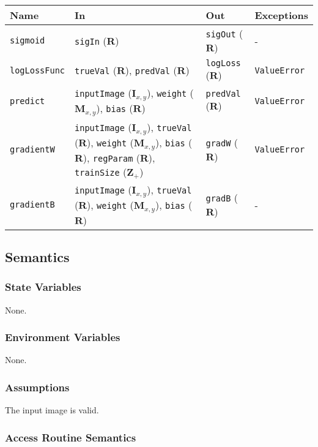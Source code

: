 \documentclass[12pt, titlepage]{article}
\def\code#1{\texttt{#1}}
\begin{document}
\begin{center}
\begin{tabular}{p{3cm} p{5cm} p{3cm} p{1cm}}
\hline
\textbf{Name} & \textbf{In} & \textbf{Out} & \textbf{Exceptions} \\
\hline
\code{sigmoid} & \code{sigIn} ($\mathbf{R}$) & \code{sigOut} ($\mathbf{R}$) & - \\
\code{logLossFunc} & \code{trueVal} ($\mathbf{R}$), \code{predVal} ($\mathbf{R}$) & \code{logLoss} ($\mathbf{R}$) & \code{ValueError} \\
\code{predict} & \code{inputImage} ($\mathbf{I}_{x,y}$), \code{weight} ($\mathbf{M}_{x,y}$), \code{bias} ($\mathbf{R}$) & \code{predVal} ($\mathbf{R}$) & \code{ValueError} \\
\code{gradientW} & \code{inputImage} ($\mathbf{I}_{x,y}$), \code{trueVal} ($\mathbf{R}$), \code{weight} ($\mathbf{M}_{x,y}$), \code{bias} ($\mathbf{R}$), \code{regParam} ($\mathbf{R}$), \code{trainSize} ($\mathbf{Z}_{+}$)& \code{gradW} ($\mathbf{R}$) & \code{ValueError} \\
\code{gradientB} & \code{inputImage} ($\mathbf{I}_{x,y}$), \code{trueVal} ($\mathbf{R}$), \code{weight} ($\mathbf{M}_{x,y}$), \code{bias} ($\mathbf{R}$)& \code{gradB} ($\mathbf{R}$) & - \\
\hline
\end{tabular}
\end{center}

\subsection{Semantics}

\subsubsection{State Variables}

None.

\subsubsection{Environment Variables}

None.

\subsubsection{Assumptions}

The input image is valid.

\subsubsection{Access Routine Semantics}
\end{document}
